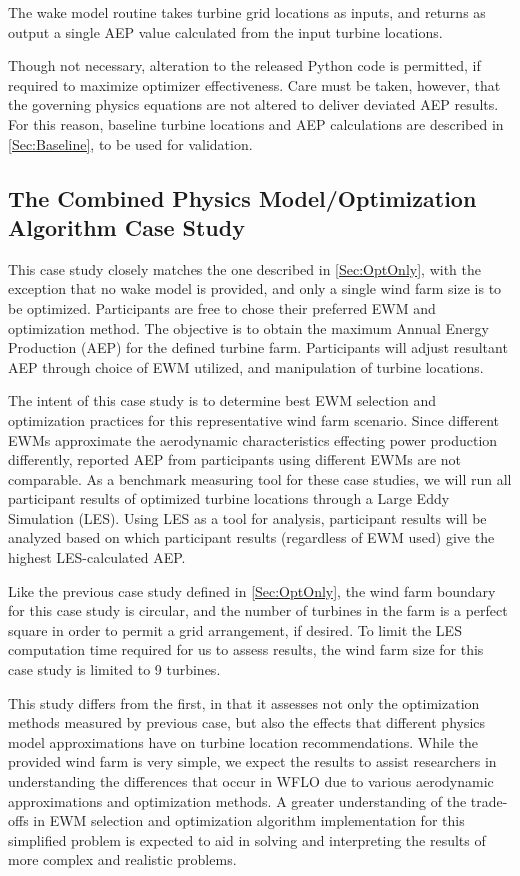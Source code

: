 \documentclass[12pt]{article}
\begin{document}
The wake model routine takes turbine grid locations as inputs, and returns as output a single AEP value calculated from the input turbine locations.

Though not necessary, alteration to the released Python code is permitted, if required to maximize optimizer effectiveness. Care must be taken, however, that the governing physics equations are not altered to deliver deviated AEP results. For this reason, baseline turbine locations and AEP calculations are described in \cref{Sec:Baseline}, to be used for validation.

\subsection{The Combined Physics Model/Optimization Algorithm Case Study}\label{Sec:Cmbnd}
    This case study closely matches the one described in \cref{Sec:OptOnly}, with the exception that no wake model is provided, and only a single wind farm size is to be optimized. Participants are free to chose their preferred EWM and optimization method. The objective is to obtain the maximum Annual Energy Production (AEP) for the defined turbine farm. Participants will adjust resultant AEP through choice of EWM utilized, and manipulation of turbine locations.
    
    The intent of this case study is to determine best EWM selection and optimization practices for this representative wind farm scenario.  Since different EWMs approximate the aerodynamic characteristics effecting power production differently, reported AEP from participants using different EWMs are not comparable. As a benchmark measuring tool for these case studies, we will run all participant results of optimized turbine locations through a Large Eddy Simulation (LES). Using LES as a tool for analysis, participant results will be analyzed based on which participant results (regardless of EWM used) give the highest LES-calculated AEP.

    Like the previous case study defined in \cref{Sec:OptOnly}, the wind farm boundary for this case study is circular, and the number of turbines in the farm is a perfect square in order to permit a grid arrangement, if desired. To limit the LES computation time required for us to assess results, the wind farm size for this case study is limited to 9 turbines.
    
    This study differs from the first, in that it assesses not only the optimization methods measured by previous case, but also the effects that different physics model approximations have on turbine location recommendations. While the provided wind farm is very simple, we expect the results to assist researchers in understanding the differences that occur in WFLO due to various aerodynamic approximations and optimization methods. A greater understanding of the trade-offs in EWM selection and optimization algorithm implementation for this simplified problem is expected to aid in solving and interpreting the results of more complex and realistic problems.
    
\end{document}
